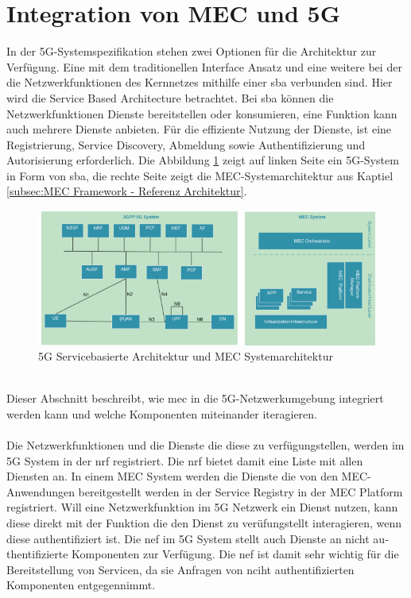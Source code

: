 \documentclass[runningheads]{llncs}
\numberwithin{figure}{section}
\begin{document}
\section{Integration von MEC und 5G}
In der 5G-Systemspezifikation stehen zwei Optionen für die Architektur zur Verfügung. 
Eine mit dem traditionellen Interface Ansatz und eine weitere 
bei der die Netzwerkfunktionen des Kernnetzes mithilfe einer \acrfull{sba} verbunden sind. 
Hier wird die Service Based Architecture betrachtet. Bei \acrshort{sba} können die Netzwerkfunktionen Dienste bereitstellen oder konsumieren, eine
Funktion kann auch mehrere Dienste anbieten. 
Für die effiziente Nutzung der Dienste, 
ist eine Registrierung, Service Discovery, Abmeldung sowie Authentifizierung und Autorisierung erforderlich.
Die Abbildung \ref{fig:sba} zeigt auf linken Seite ein 5G-System in Form von \acrshort{sba}, 
die rechte Seite zeigt die MEC-Systemarchitektur aus Kaptiel \ref{subsec:MEC Framework - Referenz Architektur}.
\begin{figure}
  \includegraphics[width=\linewidth]{images/5GMEC-System-Architecture.png}
  \caption{5G Servicebasierte Architektur und MEC Systemarchitektur \cite{arnold5GRadioAccess2017} \cite{etsiETSIGSMEC}}
  \label{fig:sba}
\end{figure}
\\
Dieser Abschnitt beschreibt, wie \acrfull{mec} in die 5G-Netzwerkumgebung integriert werden kann 
und welche Komponenten miteinander iteragieren.
\\
\\
Die Netzwerkfunktionen und die Dienste die diese zu verfügungstellen, werden im 5G System in der \acrfull{nrf} registriert.
Die \acrshort{nrf} bietet damit eine Liste mit allen Diensten an. 
In einem MEC System werden die Dienste die von den MEC- Anwendungen bereitgestellt werden in der Service Registry in der MEC Platform registriert.
Will eine Netzwerkfunktion im 5G Netzwerk ein Dienst nutzen, kann diese direkt mit der Funktion die den Dienst zu verüfungstellt interagieren,
wenn diese au­then­ti­fi­zie­rt ist. Die \acrfull{nef} im 5G System stellt auch Dienste an nicht au­then­ti­fi­zie­rte Komponenten 
zur Verfügung. Die \acrshort{nef} ist damit sehr wichtig für die Bereitstellung von Servicen, da sie Anfragen von nciht authentifizierten Komponenten
entgegennimmt.
\\
\\
\end{document}
